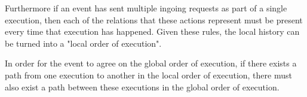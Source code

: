 	\newpar Furthermore if an event has sent multiple ingoing requests as part of a single execution, then each of the relations that these actions represent must be present every time that execution has happened. Given these rules, the local history can be turned into a "local order of execution".
	
	\newpar In order for the event to agree on the global order of execution, if there exists a path from one execution to another in the local order of execution, there must also exist a path between these executions in the global order of execution.
	
	\newpar {}